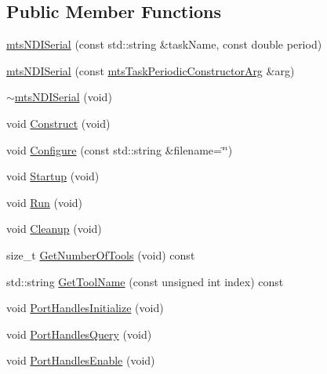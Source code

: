 \subsection*{Public Member Functions}
\begin{DoxyCompactItemize}
\item 
\hyperlink{classmts_n_d_i_serial_a3ecbc6380a7f6b50b826b797fe4c3b56}{mts\-N\-D\-I\-Serial} (const std\-::string \&task\-Name, const double period)
\item 
\hyperlink{classmts_n_d_i_serial_a5263cb07bf47fa816c500c3edd4d75da}{mts\-N\-D\-I\-Serial} (const \hyperlink{classmts_task_periodic_constructor_arg}{mts\-Task\-Periodic\-Constructor\-Arg} \&arg)
\item 
\hyperlink{classmts_n_d_i_serial_a3fd41ef271317aa18975694349345251}{$\sim$mts\-N\-D\-I\-Serial} (void)
\item 
void \hyperlink{classmts_n_d_i_serial_a55ed13bb299039b71fc05393588ffd0e}{Construct} (void)
\item 
void \hyperlink{classmts_n_d_i_serial_a5e0f4bd8a0b80e7c2e64dae6f0dd8d93}{Configure} (const std\-::string \&filename=\char`\"{}\char`\"{})
\item 
void \hyperlink{classmts_n_d_i_serial_a5a398ff09fd191621c849e527b1809ed}{Startup} (void)
\item 
void \hyperlink{classmts_n_d_i_serial_a72e2d58128b11e5d376db3ec8b3b81cb}{Run} (void)
\item 
void \hyperlink{classmts_n_d_i_serial_adbc7806bbb9185b34d28933441665440}{Cleanup} (void)
\item 
size\-\_\-t \hyperlink{classmts_n_d_i_serial_a6289bff93113fd59d316094848370212}{Get\-Number\-Of\-Tools} (void) const 
\item 
std\-::string \hyperlink{classmts_n_d_i_serial_a31848367d054d35027d2d4d8dae73bb9}{Get\-Tool\-Name} (const unsigned int index) const 
\item 
void \hyperlink{classmts_n_d_i_serial_abd97ea132bdac2d4698445529f878027}{Port\-Handles\-Initialize} (void)
\item 
void \hyperlink{classmts_n_d_i_serial_a01fdad2bcde8d45ecae952fccb3b5750}{Port\-Handles\-Query} (void)
\item 
void \hyperlink{classmts_n_d_i_serial_a984ba3c4655830850f78dd27311ff8b2}{Port\-Handles\-Enable} (void)
\end{DoxyCompactItemize}
